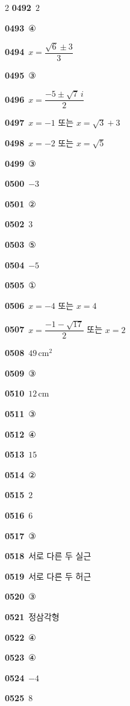 \documentclass[10pt,a4paper]{article}
\begin{document}
\begin{multicols}{2}
\noindent\textbf{0492}\ $2$\par
\noindent\textbf{0493}\ ④\par
\noindent\textbf{0494}\ $x=\dfrac{\sqrt{6}\pm 3}{3}$\par
\noindent\textbf{0495}\ ③\par
\noindent\textbf{0496}\ $x=\dfrac{-5\pm\sqrt{7}\,i}{2}$\par
\noindent\textbf{0497}\ $x=-1$ 또는 $x=\sqrt{3}+3$\par
\noindent\textbf{0498}\ $x=-2$ 또는 $x=\sqrt{5}$\par
\noindent\textbf{0499}\ ③\par
\noindent\textbf{0500}\ $-3$\par
\noindent\textbf{0501}\ ②\par
\noindent\textbf{0502}\ $3$\par
\noindent\textbf{0503}\ ⑤\par
\noindent\textbf{0504}\ $-5$\par
\noindent\textbf{0505}\ ①\par
\noindent\textbf{0506}\ $x=-4$ 또는 $x=4$\par
\noindent\textbf{0507}\ $x=\dfrac{-1-\sqrt{17}}{2}$ 또는 $x=2$\par
\noindent\textbf{0508}\ $49\,\mathrm{cm}^2$\par
\noindent\textbf{0509}\ ③\par
\noindent\textbf{0510}\ $12\,\mathrm{cm}$\par
\noindent\textbf{0511}\ ③\par
\noindent\textbf{0512}\ ④\par
\noindent\textbf{0513}\ $15$\par
\noindent\textbf{0514}\ ②\par
\noindent\textbf{0515}\ $2$\par
\noindent\textbf{0516}\ $6$\par
\noindent\textbf{0517}\ ③\par
\noindent\textbf{0518}\ 서로 다른 두 실근\par
\noindent\textbf{0519}\ 서로 다른 두 허근\par
\noindent\textbf{0520}\ ③\par
\noindent\textbf{0521}\ 정삼각형\par
\noindent\textbf{0522}\ ④\par
\noindent\textbf{0523}\ ④\par
\noindent\textbf{0524}\ $-4$\par
\noindent\textbf{0525}\ $8$\par

\end{multicols}
\end{document}

